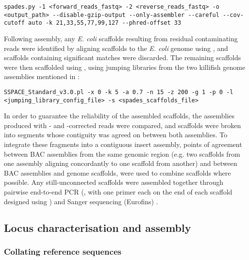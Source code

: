 \begin{lstlisting}
spades.py -1 <forward_reads_fastq> -2 <reverse_reads_fastq> -o <output_path> --disable-gzip-output --only-assembler --careful --cov-cutoff auto -k 21,33,55,77,99,127 --phred-offset 33
\end{lstlisting}

Following assembly, any \textit{E. coli} scaffolds resulting from residual contaminating reads were identified by aligning scaffolds to the \textit{E. coli} genome using  \parencite{altschul1990blast,altschul1997blast}, and scaffolds containing significant matches were discarded. The remaining scaffolds were then scaffolded using  \parencite{boetzer2011sspace}, using jumping libraries from the two killifish genome assemblies mentioned in  \parencite{valenzano2015genome,reichwald2015genome}:

\begin{lstlisting}
SSPACE_Standard_v3.0.pl -x 0 -k 5 -a 0.7 -n 15 -z 200 -g 1 -p 0 -l <jumping_library_config_file> -s <spades_scaffolds_file>
\end{lstlisting}

In order to guarantee the reliability of the assembled scaffolds, the assemblies produced with - and -corrected reads were compared, and scaffolds were broken into segments whose contiguity was agreed on between both assemblies. To integrate these fragments into a contiguous insert assembly, points of agreement between BAC assemblies from the same genomic region (e.g. two scaffolds from one assembly aligning concordantly to one scaffold from another) and between BAC assemblies and genome scaffolds, were used to combine scaffolds where possible. Any still-unconnected scaffolds were assembled together through pairwise end-to-end PCR (, with one primer each on the end of each scaffold designed using  \parencite{untergasser2012primer3}) and Sanger sequencing (Eurofins) \parencite{sanger1977sequencing}.

\subsection{Locus characterisation and assembly}
\label{sec:methods_comp_locus}

\subsubsection{Collating reference sequences}
\label{sec:methods_comp_locus_reference}

